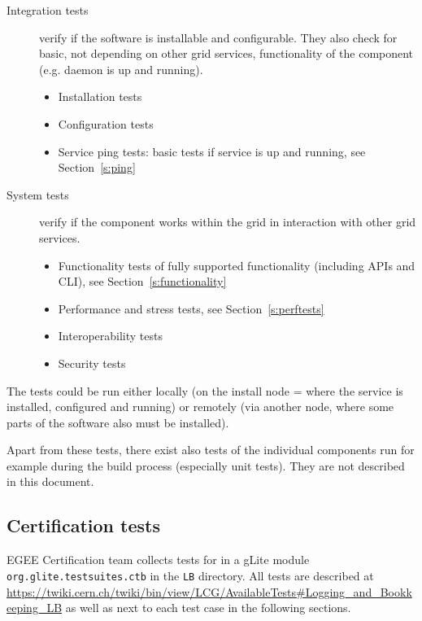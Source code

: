 \begin{description}
\item[Integration tests] verify if the software is installable and configurable.
They also check for basic, not depending on other grid services, functionality
of the component (e.g. daemon is up and running).
\begin{itemize}
\item Installation tests %
\item Configuration tests %
\item Service ping tests: basic tests if service is up and running, see Section~\ref{s:ping}
\end{itemize}
%
\item[System tests] verify if the component works within the grid in
interaction with other grid services.
\begin{itemize}
\item Functionality tests of fully supported functionality (including APIs and CLI), see Section~\ref{s:functionality}
\item Performance and stress tests, see Section~\ref{s:perftests}
\item Interoperability tests %
\item Security tests %
\end{itemize}
\end{description}

The tests could be run either locally (on the install node = where the service
is installed, configured and running) or remotely (via another node, where some
parts of the software also must be installed).

Apart from these tests, there exist also tests of the individual components run
for example during the build process (especially unit tests). They are not
described in this document.


\subsection{Certification tests}

EGEE Certification team collects tests for \LB in a gLite module
\verb'org.glite.testsuites.ctb' in the \verb'LB' directory. All \LB tests are
described at
\url{https://twiki.cern.ch/twiki/bin/view/LCG/AvailableTests#Logging_and_Bookkeeping_LB}
as well as next to each test case in the following sections.


